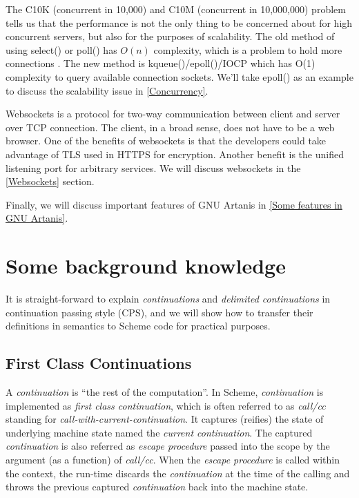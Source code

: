 \documentclass[numbers,numberedpars]{sigplanconf}
\begin{document}
The C10K (concurrent in 10,000) and C10M (concurrent in 10,000,000) problem tells us that the performance is not the only thing to be concerned about for high concurrent servers, but also for the purposes of scalability. The old method of using select() or poll() has $O(n)$ complexity, which is a problem to hold more connections \citep{lemon2001kqueue}.
The new method is kqueue()/epoll()/IOCP which has O(1) complexity to query available connection sockets. We'll take epoll() as an example to discuss the scalability issue in \ref{Concurrency}.

Websockets is a protocol for two-way communication between client and server over TCP connection. The client, in a broad sense, does not have to be a web browser. One of the benefits of websockets is that the developers could take advantage of TLS used in HTTPS for encryption. Another benefit is the unified listening port for arbitrary services. We will discuss websockets in the \ref{Websockets} section.

Finally, we will discuss important features of GNU Artanis in \ref{Some features in GNU Artanis}.

\section{Some background knowledge}

It is straight-forward to explain {\it continuations} and {\it delimited continuations} in continuation passing style (CPS), and we will show how to transfer their definitions in semantics to Scheme code for practical purposes.

\subsection{First Class Continuations}

A {\it continuation} is ``the rest of the computation''. In Scheme, {\it continuation} is implemented as {\it first class continuation}, which is often referred to as {\it call/cc} standing for {\it call-with-current-continuation}. It captures (reifies) the state of underlying machine state named the {\it current continuation}. The captured {\it continuation} is also referred as {\it escape procedure} passed into the scope by the argument (as a function) of {\it call/cc}. When the {\it escape procedure} is called within the context, the run-time discards the {\it continuation} at the time of the calling and throws the previous captured {\it continuation} back into the machine state.
\end{document}
